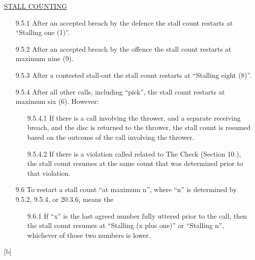 \underline{\uppercase{stall counting}}
\begin{itemize}
    \setlength\itemsep{0em}
    \tiny
    \item[9.5.1] After an accepted breach by the defence the stall count restarts at “Stalling one (1)”.
    \item[9.5.2] After an accepted breach by the offence the stall count restarts at maximum nine (9).
    \item[9.5.3] After a contested stall-out the stall count restarts at “Stalling eight (8)”.
    \item[9.5.4] After all other calls, including “pick”, the stall count restarts at maximum six (6). However:
        \begin{itemize}
            \item[9.5.4.1] If there is a call involving the thrower, and a separate receiving breach, and the disc is returned to the thrower, the stall count is resumed based on the outcome of the call involving the thrower.
            \item[9.5.4.2] If there is a violation called related to The Check (Section 10.), the stall count resumes at the same count that was determined prior to that violation.
        \end{itemize}
    \item[9.6] To restart a stall count “at maximum n”, where “n” is determined by 9.5.2, 9.5.4, or 20.3.6, means the
        \begin{itemize}
            \item[9.6.1] If “x” is the last agreed number fully uttered prior to the call, then the stall count resumes at “Stalling (x plus one)” or “Stalling n”, whichever of those two numbers is lower.
        \end{itemize}

\end{itemize}
\begin{center}[b]\end{center}
